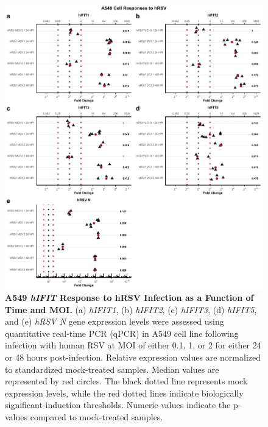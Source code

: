 \begin{figure}
    \centering
    \includegraphics[width=1\linewidth]{06. Chapter 1/Figs/01. Induction/06. a549_hrsv_timepoints.pdf}
    \caption[A549 \textit{hIFIT} Response to hRSV Infection as a Function of Time and MOI.]{\textbf{A549 \textit{hIFIT} Response to hRSV Infection as a Function of Time and MOI.} (a) \textit{hIFIT1}, (b) \textit{hIFIT2}, (c) \textit{hIFIT3}, (d) \textit{hIFIT5}, and (e) \textit{hRSV N} gene expression levels were assessed using quantitative real-time PCR (qPCR) in A549 cell line following infection with human RSV at MOI of either 0.1, 1, or 2 for either 24 or 48 hours post-infection. Relative expression values are normalized to standardized mock-treated samples. Median values are represented by red circles. The black dotted line represents mock expression levels, while the red dotted lines indicate biologically significant induction thresholds. Numeric values indicate the p-values compared to mock-treated samples.}
    \label{fig:A549 response to hRSV timepoints}
\end{figure}

